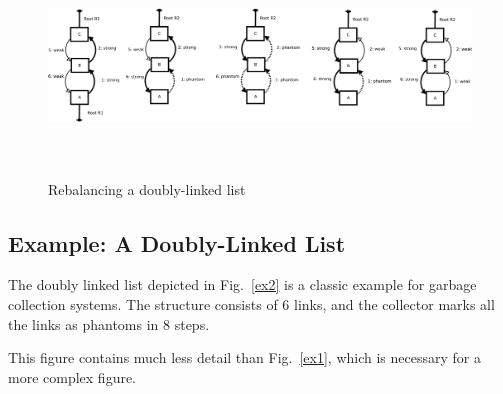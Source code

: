 \begin{figure}[!t]
  \centering
  {\includegraphics[height=2.0in]{figs/recoveringdbl}}%

  \caption{Rebalancing a doubly-linked list}%
  \label{ex3}
\end{figure}


\subsection{Example: A Doubly-Linked List}

The doubly linked list depicted in Fig.~\ref{ex2} is a classic
example for garbage collection systems. The structure consists of
6 links, and the collector marks all the links as phantoms in 8
steps.

This figure contains much less detail than Fig.~\ref{ex1}, which
is necessary for a more complex figure.



